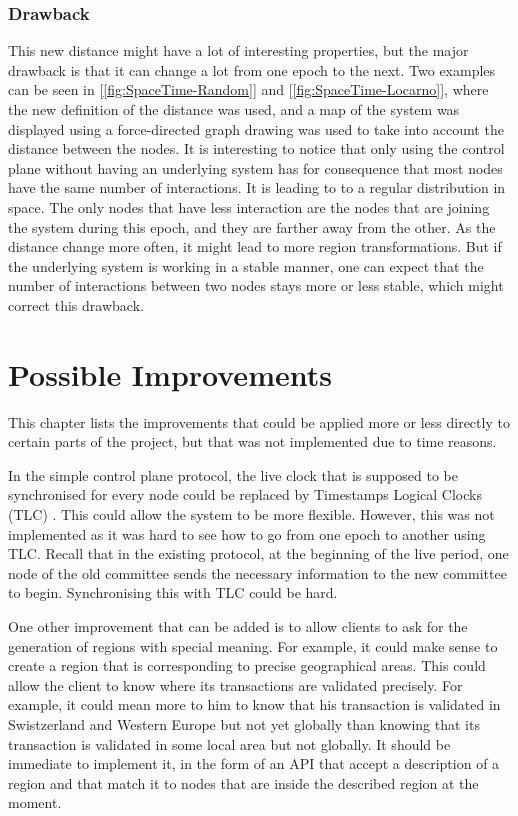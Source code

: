 \documentclass[a4paper,11pt,twoside=semi,openright]{report}
\begin{document}
\subsection{Drawback}
This new distance might have a lot of interesting properties, but the major drawback is that it can change a lot from one epoch to the next. Two examples can be seen in [\autoref{fig:SpaceTime-Random}] and [\autoref{fig:SpaceTime-Locarno}], where the new definition of the distance was used, and a map of the system was displayed using a force-directed graph drawing was used to take into account the distance between the nodes. It is interesting to notice that only using the control plane without having an underlying system has for consequence that most nodes have the same number of interactions. It is leading to to a regular distribution in space. The only nodes that have less interaction are the nodes that are joining the system during this epoch, and they are farther away from the other. As the distance change more often, it might lead to more region transformations. But if the underlying system is working in a stable manner, one can expect that the number of interactions between two nodes stays more or less stable, which might correct this drawback.


\chapter{Possible Improvements} \label{chap:Possible Improvements} %

This chapter lists the improvements that could be applied more or less directly
to certain parts of the project, but that was not implemented due to time reasons. 

In the simple control plane protocol, the live clock that is supposed to be
synchronised for every node could be replaced by Timestamps Logical Clocks (TLC)
\cite{Ford2019}. This could allow the system to be more flexible.
However, this was not implemented as it was hard to see how to go from one
epoch to another using TLC. Recall that in the existing protocol, at the
beginning of the live period, one node of the old committee sends the necessary
information to the new committee to begin. Synchronising this with TLC could be hard.

One other improvement that can be added is to allow clients to ask for the
generation of regions with special meaning. For example, it could make sense to
create a region that is corresponding to precise geographical areas. This could
allow the client to know where its transactions are validated precisely. For
example, it could mean more to him to know that his transaction is validated in
Swistzerland and Western Europe but not yet globally than knowing that its transaction
is validated in some local area but not globally. It should be immediate to implement it, in the form of an API that accept a description of a region and that match it to nodes that are inside the described region at the moment. 
\end{document}
